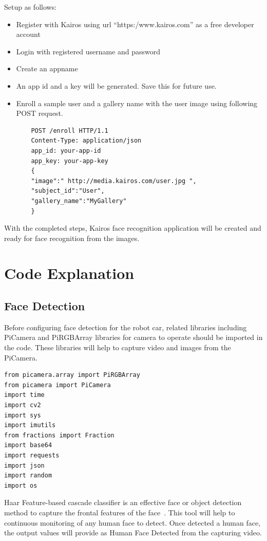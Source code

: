 Setup as follows:

\begin{itemize}
\item Register with Kairos using url ``https:/www.kairos.com'' as a free 
developer account
\item Login with registered username and password
\item Create an appname
\item An app id and a key will be generated. Save this for future use.
\item Enroll a sample user and a gallery name with the user image using 
following POST request.


    \begin{verbatim}
    POST /enroll HTTP/1.1
    Content-Type: application/json
    app_id: your-app-id
    app_key: your-app-key
    {
    "image":" http://media.kairos.com/user.jpg ",
    "subject_id":"User",
    "gallery_name":"MyGallery"
    }
    \end{verbatim}
\end{itemize}


With the completed steps, Kairos face recognition application will be created 
and ready for face recognition from the images.

\section{Code Explanation}
\subsection{Face Detection}
Before configuring face detection for the robot car, related libraries 
including PiCamera and PiRGBArray libraries for camera to operate should 
be imported in the code. These libraries will help to capture video and 
images from the PiCamera.


\begin{verbatim}
from picamera.array import PiRGBArray
from picamera import PiCamera
import time
import cv2
import sys
import imutils
from fractions import Fraction
import base64
import requests
import json
import random
import os
\end{verbatim}


Haar Feature-based cascade classifier is an effective face or object 
detection method to capture the frontal features of the 
face~\cite{viola2001}. This tool will help to continuous monitoring 
of any human face to detect. Once detected a human face, the output values 
will provide as Human Face Detected from the capturing video.


